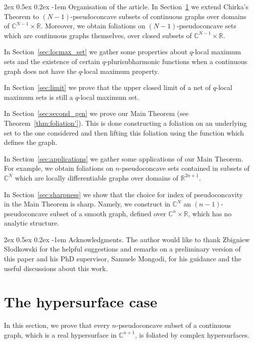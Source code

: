 \documentclass[reqno,oneside]{amsart}
\makeatletter
\newcommand{\numberset}{\mathbb}
\newcommand{\R}{\numberset{R}}
\newcommand{\C}{\numberset{C}}
\theoremstyle{definition}
\theoremstyle{plain}
\theoremstyle{remark}
\renewcommand{\paragraph}{
		\@startsection{paragraph}{4}
		{\z@}
		{2ex \@plus 0.5ex \@minus 0.2ex}
		{-1em}
		{\normalfont\bfseries}
	}
\makeatother
\begin{document}
\paragraph{Organisation of the article.}
In Section~\ref{sec:first_gen} we extend Chirka's Theorem to $(N-1)$-pseudoconcave subsets of continuous graphs over domains of $\C^{N-1}\times\R$. Moreover, we obtain foliations on $(N-1)$-pseudoconcave sets which are continuous graphs themselves, over closed subsets of $\C^{N-1}\times\R$.

In Section~\ref{sec:locmax_set} we gather some properties about $q$-local maximum sets and the existence of certain $q$-plurisubharmonic functions when a continuous graph does not have the $q$-local maximum property.

In Section~\ref{sec:limit} we prove that the upper closed limit of a net of $q$-local maximum sets is still a $q$-local maximum set.

In Section~\ref{sec:second_gen} we prove our Main Theorem (see Theorem~\ref{thm:foliation'}). This is done constructing a foliation on an underlying set to the one considered and then lifting this foliation using the function which defines the graph.

In Section~\ref{sec:applications} we gather some applications of our Main Theorem. For example, we obtain foliations on $n$-pseudoconcave sets contained in subsets of $\C^N$ which are locally differentiable graphs over domains of $\R^{2n+1}$.

In Section~\ref{sec:sharpness} we show that the choice for index of pseudoconcavity in the Main Theorem is sharp. Namely, we construct in $\C^N$ an $(n-1)$-pseudoconcave subset of a smooth graph, defined over $\C^n\times\R$, which has no analytic structure.

\paragraph{Acknowledgments.} The author would like to thank Zbigniew Słodkowski for the helpful suggestions and remarks on a preliminary version of this paper and his PhD supervisor, Samuele Mongodi, for his guidance and the useful discussions about this work.



\section{The hypersurface case}
\label{sec:first_gen}
In this section, we prove that every $n$-pseudoconcave subset of a continuous graph, which is a real hypersurface in $\C^{n+1}$, is foliated by complex hypersurfaces.
\end{document}
